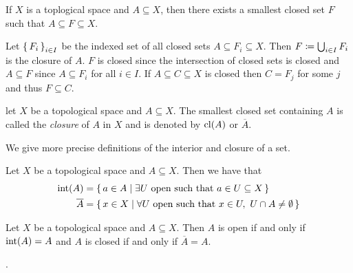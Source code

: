 \documentclass[letterpaper, 11pt]{article}
\begin{document}
\begin{prop}
  If $X$ is a toplogical space and $A \subseteq X$, then there exists a smallest closed set $F$ such that $A \subseteq F \subseteq X$.
\end{prop}
\begin{pf}
  Let $\set{F_{i}}_{i \in I}$ be the indexed set of all closed sets $A \subseteq F_{i} \subseteq X$.
  Then $F \coloneqq \bigcup_{i \in I} F_{i}$ is the closure of $A$.
  $F$ is closed since the intersection of closed sets is closed and $A \subseteq F$ since $A \subseteq F_{i}$ for all $i \in I$.
  If $A \subseteq C \subseteq X$ is closed then $C = F_{j}$ for some $j$ and thus $F \subseteq C$.
\end{pf}
\begin{defn}[Closure]
  let $X$ be a topological space and $A \subseteq X$.
  The smallest closed set containing $A$ is called the \emph{closure} of $A$ in $X$ and is denoted by $\operatorname{cl}(A)$ or $\overline{A}$.
\end{defn}

We give more precise definitions of the interior and closure of a set.

\begin{prop}\label{prop: defn_of_int_and_cl}
  Let $X$ be a topological space and $A \subseteq X$.
  Then we have that
  \begin{align*}
    \operatorname{int}(A) &= \set{a \in A | \exists U \text{ open such that } a \in U \subseteq X} \\
    \overline{A} &= \set{x \in X | \forall U \text{ open such that } x \in U,~ U \cap A \neq \emptyset}
  \end{align*}
\end{prop}
\begin{pf}
\end{pf}

\begin{prop}
  Let $X$ be a topological space and $A \subseteq X$.
  Then $A$ is open if and only if $\operatorname{int}(A) = A$ and $A$ is closed if and only if $\overline{A} = A$.
\end{prop}
\begin{pf}
  .
\end{pf}
\end{document}
